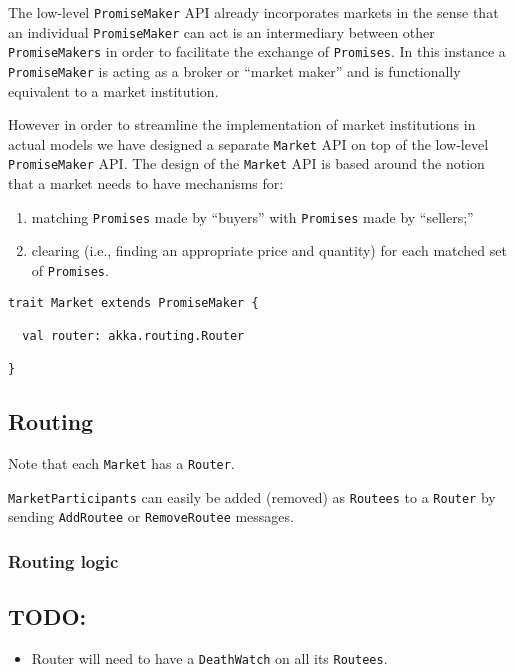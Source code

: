 \documentclass[a4paper]{article}
\begin{document}
The low-level \texttt{PromiseMaker} API already incorporates markets in the sense that an individual \texttt{PromiseMaker} can act is an intermediary between other \texttt{PromiseMakers} in order to facilitate the exchange of \texttt{Promises}.  In this instance a \texttt{PromiseMaker} is acting as a broker or  ``market maker'' and is functionally equivalent to a market institution.  

However in order to streamline the implementation of market institutions in actual models we have designed a separate \texttt{Market} API on top of the low-level \texttt{PromiseMaker} API.  The design of the \texttt{Market} API is based around the notion that a market needs to have mechanisms for:
\begin{enumerate}
	\item matching \texttt{Promises} made by ``buyers'' with \texttt{Promises} made by ``sellers;''
	\item clearing (i.e., finding an appropriate price and quantity) for each matched set of \texttt{Promises}.
\end{enumerate}

\begin{verbatim}
trait Market extends PromiseMaker {

  val router: akka.routing.Router

}
\end{verbatim}

\subsection{Routing}
Note that each \texttt{Market} has a \texttt{Router}.

\texttt{MarketParticipants} can easily be added (removed) as \texttt{Routees} to a \texttt{Router} by sending \texttt{AddRoutee} or \texttt{RemoveRoutee} messages.

\subsubsection{Routing logic}

\subsection{TODO:}

\begin{itemize}
	\item Router will need to have a \texttt{DeathWatch} on all its \texttt{Routees}.
\end{itemize}
\end{document}
